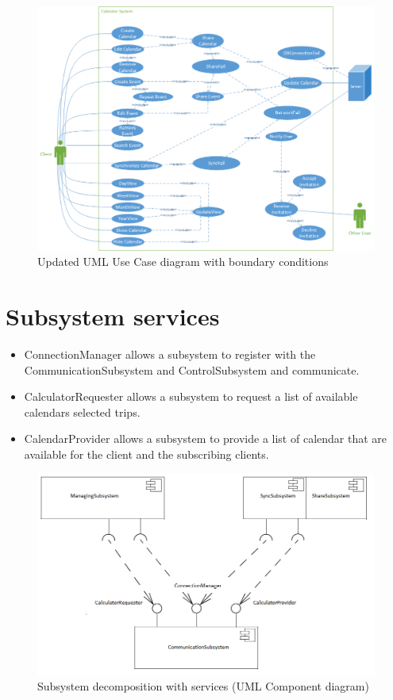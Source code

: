 \begin{figure}[ht!]
\centering
\includegraphics[width=160mm]{usecase.png}
\caption{Updated UML Use Case diagram with  boundary conditions \label{overflow}}
\end{figure}


\newpage
\chapter*{Subsystem services}

\begin{itemize}
	\item ConnectionManager allows a subsystem to register with the CommunicationSubsystem and ControlSubsystem and communicate.
	\item CalculatorRequester allows a subsystem to request a list of available calendars selected trips.
	\item CalendarProvider allows a subsystem to provide a list of calendar that are available for the client and the subscribing clients. 
\end{itemize}

\begin{figure}[ht!]
\centering
\includegraphics[width=160mm]{UMLComponentService.png}
\caption{Subsystem decomposition with services (UML Component diagram) \label{overflow}}
\end{figure}

